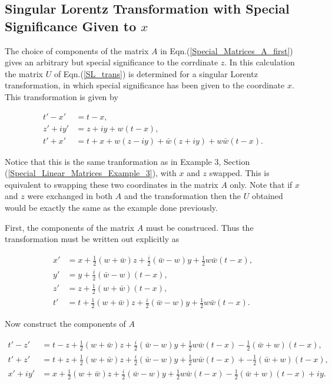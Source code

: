 \begin{appendix}

\section{Singular Lorentz Transformation with Special Significance Given to $x$}\label{Appendix_Special_Significance_x}

The choice of components of the matrix $A$ in Eqn.(\ref{Special_Matrices_A_first}) gives an arbitrary but special significance to the corrdinate $z$. In this calculation the matrix $U$ of Eqn.(\ref{SL_trans}) is determined for a singular Lorentz transformation, in which special significance has been given to the coordinate $x$. This transformation is given by

\begin{align*}
t'-x' & = t-x, \\
z'+iy' & = z + iy + w(t-x), \\
t'+x' & = t+x + w(z-iy) + \bar{w} (z + iy) + w \bar{w} (t-x).
\end{align*}

\noindent Notice that this is the same tranformation as in Example 3, Section (\ref{Special_Linear_Matrices_Example_3}), with $x$ and $z$ swapped. This is equivalent to swapping these two coordinates in the matrix $A$ only. Note that if $x$ and $z$ were exchanged in both $A$ and the transformation then the $U$ obtained would be exactly the same as the example done previously.

First, the components of the matrix $A$ must be construced. Thus the transformation must be written out explicitly as 

\begin{align*}
x' & = x + \frac{1}{2} (w + \bar{w})z + \frac{i}{2}(\bar{w}- w)y + \frac{1}{2}w\bar{w}(t-x), \\
y' & = y + \frac{i}{2} (\bar{w} - w)(t-x), \\
z' & = z + \frac{1}{2} (w + \bar{w})(t-x), \\
t' & = t + \frac{1}{2} (w + \bar{w})z + \frac{i}{2} (\bar{w}-w)y + \frac{1}{2} w\bar{w}(t-x).
\end{align*}

\noindent Now construct the components of $A$

\begin{align*}
t' - z' & = t - z + \frac{1}{2}(w + \bar{w})z + \frac{i}{2} (\bar{w}-w)y + \frac{1}{2}w\bar{w}(t-x) - \frac{1}{2}(\bar{w} + w)(t-x),\\
t' + z' & = t + z + \frac{1}{2}(w + \bar{w})z + \frac{i}{2} (\bar{w}-w)y + \frac{1}{2}w\bar{w}(t-x) + -\frac{1}{2}(\bar{w} + w)(t-x),\\
x' + iy' & = x +  \frac{1}{2}(w + \bar{w})z + \frac{i}{2} (\bar{w}-w)y + \frac{1}{2}w\bar{w}(t-x) - \frac{1}{2}(\bar{w} + w)(t-x) + iy.
\end{align*}


\end{appendix}
